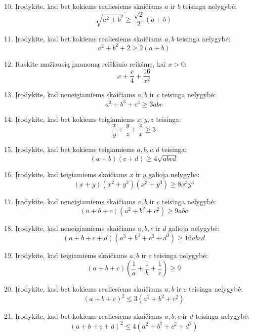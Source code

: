 \documentclass[11pt,a4paper]{scrartcl}
\begin{document}
\begin{enumerate}
    \setcounter{enumi}{9}

    \item Įrodykite, kad bet kokiems realiesiems skaičiams $a$ ir $b$ teisinga nelygybė:
    $$ \sqrt{a^2+b^2} \ge \frac{\sqrt{2}}{2}(a+b) $$

    \item Įrodykite, kad bet kokiems realiesiems skaičiams $a, b$ teisinga nelygybė:
    $$ a^2 + b^2 + 2 \ge 2(a + b) $$

    \item Raskite mažiausią įmanomą reiškinio reikšmę, kai $x > 0$:
    $$ x + \frac{x}{4} + \frac{16}{x^2} $$

    \item Įrodykite, kad neneigiamiems skaičiams $a, b$ ir $c$ teisinga nelygybė:
    $$ a^3+b^3+c^3 \ge 3abc $$

    \item Įrodykite, kad bet kokiems teigiamiems $x, y, z$ teisinga:
    $$ \frac{x}{y} + \frac{y}{z} + \frac{z}{x} \ge 3 $$

    \item Įrodykite, kad bet kokiems teigiamiems $a, b, c, d$ teisinga:
    $$ (a+b)(c+d) \ge 4\sqrt{abcd} $$

    \item Įrodykite, kad teigiamiems skaičiams $x$ ir $y$ galioja nelygybė:
    $$ (x+y)(x^2+y^2)(x^3+y^3) \ge 8x^3y^3 $$

    \item Įrodykite, kad neneigiamiems skaičiams $a, b$ ir $c$ teisinga nelygybė:
    $$ (a+b+c)(a^2+b^2+c^2) \ge 9abc $$

    \item Įrodykite, kad neneigiamiems skaičiams $a, b, c$ ir $d$ galioja nelygybė:
    $$ (a+b+c+d)(a^3+b^3+c^3+d^3) \ge 16abcd $$

    \item Įrodykite, kad teigiamiems skaičiams $a, b$ ir $c$ teisinga nelygybė:
    $$ (a+b+c)\left(\frac{1}{a}+\frac{1}{b}+\frac{1}{c}\right) \ge 9 $$

    \item Įrodykite, kad bet kokiems realiesiems skaičiams $a, b$ ir $c$ teisinga nelygybė:
    $$ (a+b+c)^2 \le 3(a^2+b^2+c^2) $$

    \item Įrodykite, kad bet kokiems realiesiems skaičiams $a, b, c$ ir $d$ teisinga nelygybė:
    $$ (a+b+c+d)^2 \le 4(a^2+b^2+c^2+d^2) $$
\end{enumerate}
\end{document}
